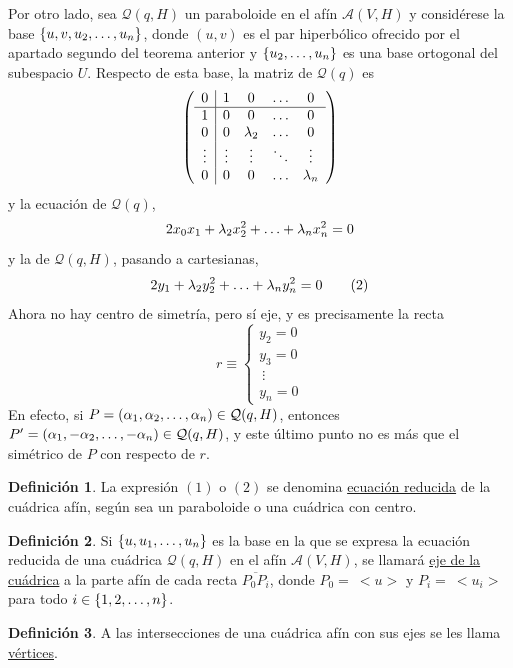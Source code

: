 \documentclass[12pt]{report}
\theoremstyle{definition}
\newtheorem{definition}{Definición}[chapter]
\theoremstyle{definition}
\theoremstyle{remark}
\begin{document}
\vspace{2mm}
Por otro lado, sea $\mathcal{Q}(q,H)$ un paraboloide en el afín $\mathcal{A}(V,H)$ y considérese la base $\{u,v,u_2,\mathellipsis,u_n\}$, donde $(u,v)$ es el par hiperbólico ofrecido por el apartado segundo del teorema anterior y $\{u_2,\mathellipsis,u_n\}$ es una base ortogonal del subespacio $U$. Respecto de esta base, la matriz de $\mathcal{Q}(q)$ es
\[\left( \begin{array}{c|cccc}
    0 & 1 & 0 & \mathellipsis & 0 \\ \hline
    1 & 0 & 0 & \mathellipsis & 0 \\
    0 & 0 & \lambda_2 & \mathellipsis & 0 \\
    \vdots & \vdots & \vdots & \ddots & \vdots \\
    0 & 0 & 0 & \mathellipsis & \lambda_n
\end{array} \right)\]
y la ecuación de $\mathcal{Q}(q)$,
\[2x_0x_1+\lambda_2 x_2^2 + \mathellipsis+\lambda_nx_n^2 = 0\]
y la de $\mathcal{Q}(q,H)$, pasando a cartesianas,
\[2y_1+\lambda_2 y_2^2 + \mathellipsis+\lambda_ny_n^2 = 0 \tag{2}\]
Ahora no hay centro de simetría, pero sí eje, y es precisamente la recta
\[r \equiv \begin{cases}
    y_2 = 0 \\
    y_3 = 0 \\
    \ \vdots \\
    y_n = 0
\end{cases}\]
En efecto, si $P = (\alpha_1, \alpha_2,\mathellipsis,\alpha_n) \in \mathcal{Q}(q,H)$, entonces $P' = (\alpha_1, -\alpha_2,\mathellipsis,-\alpha_n) \in \mathcal{Q}(q,H)$, y este último punto no es más que el simétrico de $P$ con respecto de $r$.

\begin{definition}
La expresión $(1)$ o $(2)$ se denomina \ul{ecuación reducida} de la cuádrica afín, según sea un paraboloide o una cuádrica con centro.
\end{definition}

\begin{definition}
Si $\{u,u_1,\mathellipsis,u_n\}$ es la base en la que se expresa la ecuación reducida de una cuádrica $\mathcal{Q}(q,H)$ en el afín $\mathcal{A}(V,H)$, se llamará \ul{eje de la cuádrica} a la parte afín de cada recta $\overline{P_0P_i}$, donde $P_0 = \ <u>$ y $P_i = \ <u_i>$ para todo $i \in \{1,2,\mathellipsis,n\}$.
\end{definition}

\begin{definition}
A las intersecciones de una cuádrica afín con sus ejes se les llama \ul{vértices}.
\end{definition}
\end{document}
